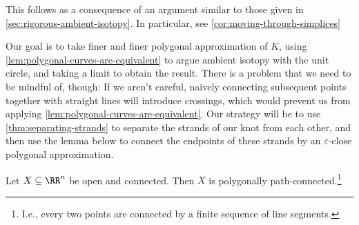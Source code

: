 \begin{sproof}
  This follows as a consequence of an argument similar to those given
  in \cref{sec:rigorous-ambient-isotopy}. In particular, see
  \cref{cor:moving-through-simplices}
\end{sproof}
Our goal is to take finer and finer polygonal approximation of $K$,
using \cref{lem:polygonal-curves-are-equivalent} to argue ambient
isotopy with the unit circle, and taking a limit to obtain the result.
There is a problem that we need to be mindful of, though: If we aren't
careful, naively connecting subsequent points together with straight
lines will introduce crossings, which would prevent us from applying
\cref{lem:polygonal-curves-are-equivalent}. Our strategy will be to
use \cref{thm:separating-strands} to separate the strands of our knot
from each other, and then use the lemma below to connect the endpoints
of these strands by an $\varepsilon$-close polygonal approximation.
\begin{lemma}\label{lem:polygonal-path-connected}
  Let $X \subseteq \RR^n$ be open and connected. Then $X$ is
  polygonally path-connected.\footnote{I.e., every two points are
    connected by a finite sequence of line segments.}
\end{lemma}
